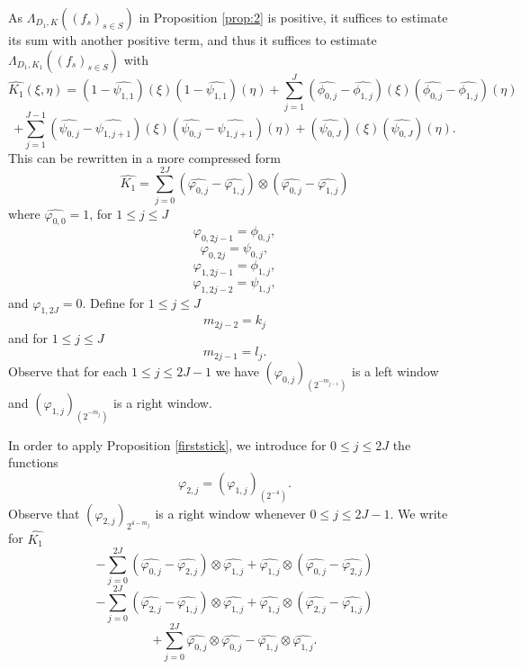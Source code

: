 \documentclass[12pt,reqno]{amsart}
\theoremstyle{plain}
\theoremstyle{definition}
\numberwithin{equation}{section}
\begin{document}
 
 As $\Lambda_{D_1,K}((f_s)_{s\in S})$ in  Proposition \ref{prop:2} is positive,
 it suffices to estimate its sum 
 with another positive term, and thus it suffices to estimate
 $\Lambda_{D_1,{K_1}}((f_s)_{s\in S})$ with
 \[
\widehat{K_1}(\xi,\eta) =
(1-\widehat{\psi_{1,1}})(\xi) (1-\widehat{\psi_{1,1}})(\eta)+\sum_{j=1}^J (\widehat{\phi_{0,j}}-\widehat{\phi_{1,j}})(\xi)(\widehat{\phi_{0,j}}-\widehat{\phi_{1,j}})(\eta)\]
\[+ \sum_{j=1}^{J-1} (\widehat{\psi_{0,j}}-\widehat{\psi_{1,j+1}})(\xi)
(\widehat{\psi_{0,j}}-\widehat{\psi_{1,j+1}})(\eta)+
(\widehat{\psi_{0,J}})(\xi)(\widehat{\psi_{0,J}})(\eta).\]
This can be rewritten in a more compressed form  
\[\widehat{K_1}=\sum_{j=0}^{2J} (\widehat{\varphi_{0,j}}-\widehat{\varphi_{1,j}})\otimes (\widehat{\varphi_{0,j}}-\widehat{\varphi_{1,j}})\]
where $\widehat{\varphi_{0,0}}=1$, for $1\le j\le J$
\[\varphi_{0,2j-1}=\phi_{0,j},\]
\[\varphi_{0,2j}=\psi_{0,j},\]
\[\varphi_{1,2j-1}=\phi_{1,j},\]
\[\varphi_{1,2j-2}=\psi_{1,j},\]
and ${\varphi_{1,2J}}=0$. 
Define for $1\le j\le J$
\[m_{2j-2}=k_{j}\]
and for $1\le j\le J$
\[m_{2j-1}=l_j.\]
Observe that for each $1\le j\le 2J-1$
we have
$(\varphi_{0,j})_{(2^{-m_{j-1}})}$ is a left window and 
$(\varphi_{1,j})_{(2^{-m_j})}$ is a right window.


 



 
In order to apply Proposition \ref{firststick},
we introduce for $0\le j\le 2J$ the functions 
\[\varphi_{2,j}=(\varphi_{1,j})_{(2^{-4})}.\]
Observe that  $(\varphi_{2,j})_{2^{4-m_j}}$ is a  right window whenever $0 \leq j \leq 2J-1$.
We write for $\widehat{K_1}$
\begin{equation}\label{eq:e1}
-\sum_{j=0}^{2J}(\widehat{\varphi_{0,j}} -\widehat{\varphi_{2,j}})\otimes   \widehat{\varphi_{1,j}} 
+\widehat{\varphi_{1,j}}\otimes  (\widehat{\varphi_{0,j}} -\widehat{\varphi_{2,j}})  
\end{equation}
\begin{equation}\label{eq:e2}
-\sum_{j=0}^{2J}(\widehat{\varphi_{2,j}} -\widehat{\varphi_{1,j}})\otimes   \widehat{\varphi_{1,j}}
+\widehat{\varphi_{1,j}}\otimes  (\widehat{\varphi_{2,j}} -\widehat{\varphi_{1,j}})  
\end{equation}
\begin{equation}\label{eq:e3}
+\sum_{j=0}^{2J}\widehat{\varphi_{0,j}}\otimes   \widehat{\varphi_{0,j}}
-\widehat{\varphi_{1,j}}\otimes   \widehat{\varphi_{1,j}}.
\end{equation}
\end{document}
